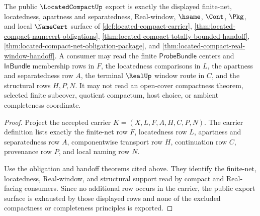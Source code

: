 \begin{theorem}
\label{thm:locatedcompact-public-export-surface}
The public $\LocatedCompactUp$ export is exactly the displayed finite-net, locatedness, apartness and separatedness, Real-window, $\hsame$, $\Cont$, $\Pkg$, and local $\NameCert$ surface of \autoref{def:located-compact-carrier}, \autoref{thm:located-compact-namecert-obligations}, \autoref{thm:located-compact-totally-bounded-handoff}, \autoref{thm:located-compact-net-obligation-package}, and \autoref{thm:located-compact-real-window-handoff}. A consumer may read the finite $\mathsf{ProbeBundle}$ centers and $\mathsf{InBundle}$ membership rows in $F$, the locatedness comparisons in $L$, the apartness and separatedness row $A$, the terminal $\RealUp$ window route in $C$, and the structural rows $H,P,N$. It may not read an open-cover compactness theorem, selected finite subcover, quotient compactum, host choice, or ambient completeness coordinate.
\end{theorem}
\begin{proof}
Project the accepted carrier $K=(X,L,F,A,H,C,P,N)$. The carrier definition lists exactly the finite-net row $F$, locatedness row $L$, apartness and separatedness row $A$, componentwise transport row $H$, continuation row $C$, provenance row $P$, and local naming row $N$.

Use the obligation and handoff theorems cited above. They identify the finite-net, locatedness, Real-window, and structural support read by compact and Real-facing consumers. Since no additional row occurs in the carrier, the public export surface is exhausted by those displayed rows and none of the excluded compactness or completeness principles is exported.
\end{proof}

